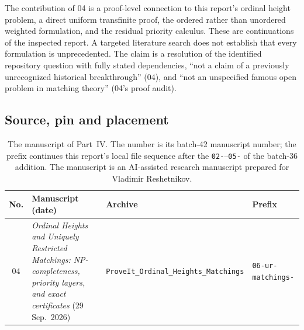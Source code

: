 \documentclass[11pt,a4paper]{article}
\theoremstyle{definition}
\theoremstyle{remark}
\begin{document}
The contribution of 04 is a proof-level connection to this report's ordinal
height problem, a direct uniform transfinite proof, the ordered rather than
unordered weighted formulation, and the residual priority calculus. These are
continuations of the inspected report. A targeted literature search does
not establish that every formulation is unprecedented. The claim is a
resolution of the identified repository question with fully stated
dependencies, ``not a claim of a previously unrecognized historical
breakthrough'' (04), and ``not an unspecified famous open problem in matching
theory'' (04's proof audit).

\subsection{Source, pin and placement}\label{nh:ur:sec:source}

\begin{table}[htbp]
\centering\small
\renewcommand{\arraystretch}{1.18}
\begin{tabularx}{\linewidth}{@{}c>{\raggedright\arraybackslash}X>{\raggedright\arraybackslash}p{.27\linewidth}l@{}}
\toprule
No. & Manuscript (date) & Archive & Prefix\\
\midrule
04 & \emph{Ordinal Heights and Uniquely Restricted Matchings:
NP-completeness, priority layers, and exact certificates} (29 Sep.\ 2026)
& \texttt{ProveIt\_Ordinal\_\allowbreak Heights\_\allowbreak Matchings} &
\texttt{06-ur-matchings-}\\
\bottomrule
\end{tabularx}
\caption{The manuscript of Part~IV. The number is its batch-42 manuscript
number; the prefix continues this report's local file sequence after the
\texttt{02-}--\texttt{05-} of the batch-36 addition. The manuscript is an
AI-assisted research manuscript prepared for Vladimir Reshetnikov.}
\label{nh:ur:tab:source}
\end{table}
\end{document}
